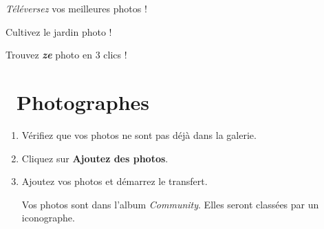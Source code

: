 \documentclass[12pt,nofoldmark,notumble]{leaflet}
\begin{document}
\begin{description}[align=right,labelwidth=2.3cm]
\item [Photographes] \emph{Téléversez} vos meilleures photos !
\item [Iconographes] Cultivez le jardin photo !
\item [Graphistes] Trouvez \textbf{\textit{ze}} photo en 3 clics !
\end{description}

\clearpage
\section{\faCamera  Photographes}

\vspace*{\fill}

\begin{enumerate}[itemsep=0mm,leftmargin=*]

\item Vérifiez que vos photos ne sont pas déjà dans la galerie.
\item Cliquez sur \textbf{Ajoutez des photos}.
  \end{enumerate}
\begin{center}
\setlength{\fboxsep}{0pt}%
\setlength{\fboxrule}{0pt}%
%
\end{center}
  \begin{enumerate}
  \setcounter{enumi}{2}
\item Ajoutez vos photos et démarrez le transfert.

  Vos photos sont dans l'album \emph{Community}. Elles seront classées par un iconographe.
  
\end{enumerate}
\end{document}
